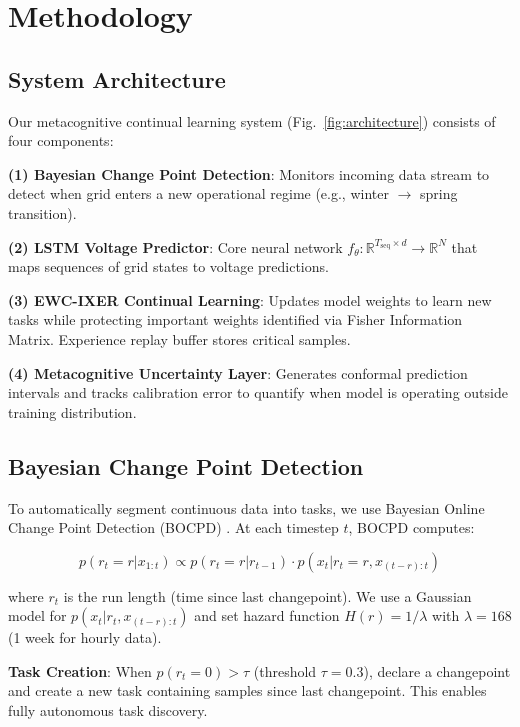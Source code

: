 \documentclass[journal]{IEEEtran}
\begin{document}
\section{Methodology}

\subsection{System Architecture}

Our metacognitive continual learning system (Fig.~\ref{fig:architecture}) consists of four components:

\textbf{(1) Bayesian Change Point Detection}: Monitors incoming data stream to detect when grid enters a new operational regime (e.g., winter $\to$ spring transition).

\textbf{(2) LSTM Voltage Predictor}: Core neural network $f_\theta : \mathbb{R}^{T_{\text{seq}} \times d} \to \mathbb{R}^N$ that maps sequences of grid states to voltage predictions.

\textbf{(3) EWC-IXER Continual Learning}: Updates model weights to learn new tasks while protecting important weights identified via Fisher Information Matrix. Experience replay buffer stores critical samples.

\textbf{(4) Metacognitive Uncertainty Layer}: Generates conformal prediction intervals and tracks calibration error to quantify when model is operating outside training distribution.

\subsection{Bayesian Change Point Detection}

To automatically segment continuous data into tasks, we use Bayesian Online Change Point Detection (BOCPD) \cite{adams2007bayesian}. At each timestep $t$, BOCPD computes:

\begin{equation}
p(r_t = r | x_{1:t}) \propto p(r_t = r | r_{t-1}) \cdot p(x_t | r_t = r, x_{(t-r):t})
\end{equation}

where $r_t$ is the run length (time since last changepoint). We use a Gaussian model for $p(x_t | r_t, x_{(t-r):t})$ and set hazard function $H(r) = 1/\lambda$ with $\lambda = 168$ (1 week for hourly data).

\textbf{Task Creation}: When $p(r_t = 0) > \tau$ (threshold $\tau = 0.3$), declare a changepoint and create a new task containing samples since last changepoint. This enables fully autonomous task discovery.
\end{document}
